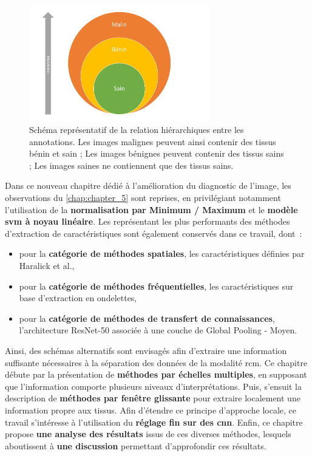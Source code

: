 \begin{figure}[H]
    \centering
    \includegraphics[width=0.7\textwidth]{contents/chapter_6/resources/scheme_image_improvement_annotations_hierarchy.pdf}
    \caption{Schéma représentatif de la relation hiérarchiques entre les annotations. Les images malignes peuvent ainsi contenir des tissus bénin et sain ; Les images bénignes peuvent contenir des tissus sains ; Les images saines ne contiennent que des tissus sains.}
    \label{fig:scheme_image_improvement_annotations_hierarchy}
\end{figure}\par

Dans ce nouveau chapitre dédié à l'amélioration du diagnostic de l'image, les observations du \cref{chap:chapter_5} sont reprises, en privilégiant notamment l'utilisation de la \textbf{normalisation par Minimum / Maximum} et le \textbf{modèle \gls{svm} à noyau linéaire}. Les représentant les plus performants des méthodes d'extraction de caractéristiques sont également conservés dans ce travail, dont~:
\begin{itemize}
    \item pour la \textbf{catégorie de méthodes spatiales}, les caractéristiques définies par Haralick et al.,
    \item pour la \textbf{catégorie de méthodes fréquentielles}, les caractéristiques sur base d'extraction en ondelettes,
    \item pour la \textbf{catégorie de méthodes de transfert de connaissances}, l'architecture ResNet-50 associée à une couche de Global Pooling - Moyen.
\end{itemize}\par

Ainsi, des schémas alternatifs sont envisagés afin d'extraire une information suffisante nécessaires à la séparation des données de la modalité \gls{rcm}. Ce chapitre débute par la présentation de \textbf{méthodes par échelles multiples}, en supposant que l'information comporte plusieurs niveaux d'interprétations. Puis, s'ensuit la description de \textbf{méthodes par fenêtre glissante} pour extraire localement une information propre aux tissus. Afin d'étendre ce principe d'approche locale, ce travail s'intéresse à l'utilisation du \textbf{réglage fin sur des \gls{cnn}}. Enfin, ce chapitre propose \textbf{une analyse des résultats} issus de ces diverses méthodes, lesquels aboutissent à \textbf{une discussion} permettant d'approfondir ces résultats.\par
\clearpage

